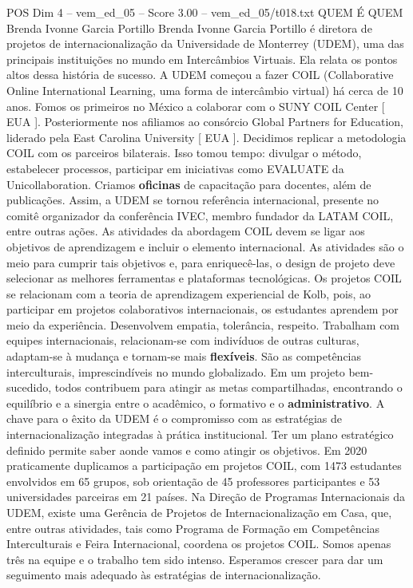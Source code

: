 \begin{textsample}{POS Dim 4 – vem\_ed\_05 – Score 3.00 – vem\_ed\_05/t018.txt}  \label{ex:f4_pos_078}
QUEM É QUEM Brenda Ivonne Garcia Portillo Brenda Ivonne Garcia Portillo é diretora de projetos de internacionalização da Universidade de Monterrey (UDEM), uma das principais instituições no mundo em Intercâmbios Virtuais.
Ela relata os pontos altos dessa história de sucesso.
A UDEM começou a fazer COIL (Collaborative Online International Learning, uma forma de intercâmbio virtual) há cerca de 10 anos.
Fomos os primeiros no México a colaborar com o SUNY COIL Center [ EUA ].
Posteriormente nos afiliamos ao consórcio Global Partners for Education, liderado pela East Carolina University [ EUA ].
Decidimos replicar a metodologia COIL com os parceiros bilaterais.
Isso tomou tempo: divulgar o método, estabelecer processos, participar em iniciativas como EVALUATE da Unicollaboration.
Criamos \textbf{oficinas} de capacitação para docentes, além de publicações.
Assim, a UDEM se tornou referência internacional, presente no comitê organizador da conferência IVEC, membro fundador da LATAM COIL, entre outras ações.
As atividades da abordagem COIL devem se ligar aos objetivos de aprendizagem e incluir o elemento internacional.
As atividades são o meio para cumprir tais objetivos e, para enriquecê-las, o design de projeto deve selecionar as melhores ferramentas e plataformas tecnológicas.
Os projetos COIL se relacionam com a teoria de aprendizagem experiencial de Kolb, pois, ao participar em projetos colaborativos internacionais, os estudantes aprendem por meio da experiência.
Desenvolvem empatia, tolerância, respeito.
Trabalham com equipes internacionais, relacionam-se com indivíduos de outras culturas, adaptam-se à mudança e tornam-se mais \textbf{flexíveis}.
São as competências interculturais, imprescindíveis no mundo globalizado.
Em um projeto bem-sucedido, todos contribuem para atingir as metas compartilhadas, encontrando o equilíbrio e a sinergia entre o acadêmico, o formativo e o \textbf{administrativo}.
A chave para o êxito da UDEM é o compromisso com as estratégias de internacionalização integradas à prática institucional.
Ter um plano estratégico definido permite saber aonde vamos e como atingir os objetivos.
Em 2020 praticamente duplicamos a participação em projetos COIL, com 1473 estudantes envolvidos em 65 grupos, sob orientação de 45 professores participantes e 53 universidades parceiras em 21 países.
Na Direção de Programas Internacionais da UDEM, existe uma Gerência de Projetos de Internacionalização em Casa, que, entre outras atividades, tais como Programa de Formação em Competências Interculturais e Feira Internacional, coordena os projetos COIL.
Somos apenas três na equipe e o trabalho tem sido intenso.
Esperamos crescer para dar um seguimento mais adequado às estratégias de internacionalização.

\end{textsample}
